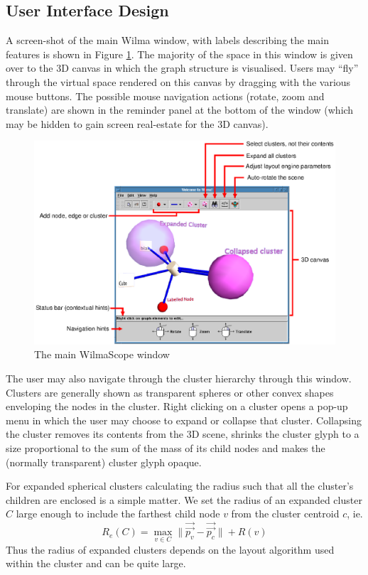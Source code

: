 \documentclass[runningheads]{cl2emult}
\newcommand{\avec}[1]{\vec{\overrightarrow{ #1}}}
\begin{document}
\subsection{User Interface Design}
A screen-shot of the main Wilma window, with labels describing the main
features is shown in Figure \ref{fig-controls}.
The majority of the space in this window is given over to the 3D
canvas in which the graph structure is visualised.  Users may ``fly''
through the virtual space rendered on this canvas by dragging with the
various mouse buttons.  The possible mouse navigation actions (rotate,
zoom and translate) are
shown in the reminder panel at the bottom of the window (which may be
hidden to gain screen real-estate for the 3D canvas).
\begin{figure}[h]
  \centering
    \label{fig-controls}
    \includegraphics[width=\textwidth]{figures/wilmacontrols.eps}
    \caption{The main WilmaScope window}
\end{figure}

The user may also navigate through the cluster hierarchy through this
window.  Clusters are generally shown as transparent spheres or other
convex shapes enveloping the nodes in the cluster.  Right clicking on a
cluster opens a pop-up menu in which the user may choose to expand or
collapse that cluster.  Collapsing the cluster removes its contents
from the 3D scene, shrinks the cluster glyph to a
size proportional to the sum of the mass of its child nodes
and makes the (normally transparent) cluster glyph opaque.

For expanded spherical clusters calculating the radius such that all the
cluster's children are enclosed is a simple matter.  We set the radius
of an expanded cluster $C$ large enough to include the farthest child node
$v$ from the cluster centroid $c$, ie.
\[
R_e(C) = \max_{v \in C} \| \avec{p_v} - \avec{p_c} \| + R(v)
\]
Thus the radius of expanded clusters
depends on the layout algorithm used within the cluster and can be
quite large.
\end{document}
